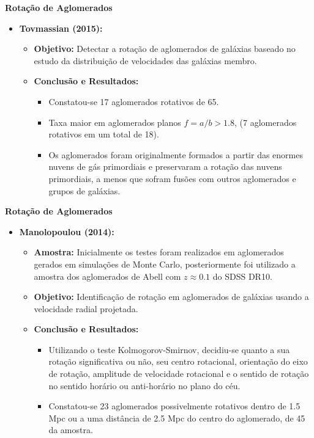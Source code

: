 \documentclass[xcolor=dvipsnames,10pt]{beamer}
\begin{document}
\begin{frame}{\textbf{Rotação de Aglomerados}}
\begin{itemize}
  \item {\textbf{Tovmassian (2015):}}  
    \begin{itemize}
      \item \textbf{Objetivo:} Detectar a rotação de aglomerados de galáxias baseado no estudo da distribuição de velocidades das galáxias membro.
      \item \textbf{Conclusão e Resultados:}
      \begin{itemize}
        \item Constatou-se 17 aglomerados rotativos de 65.
        \item Taxa maior em aglomerados planos $f=a/b > 1.8$, (7 aglomerados rotativos em um total de 18).
        \item Os aglomerados foram originalmente formados a partir das enormes nuvens de gás primordiais e preservaram a rotação das nuvens primordiais, a menos que sofram fusões com outros aglomerados e grupos de galáxias.
      \end{itemize}
    \end{itemize}
\end{itemize}
\end{frame}

\begin{frame}{\textbf{Rotação de Aglomerados}}
\begin{itemize}
  \item {\textbf{Manolopoulou (2014):}}
    \begin{itemize}
      \item \textbf{Amostra:} Inicialmente os testes foram realizados em aglomerados gerados em simulações de Monte Carlo, posteriormente foi utilizado a amostra dos aglomerados de Abell com $z \approx 0.1$ do SDSS DR10.
      \item \textbf{Objetivo:} Identificação de rotação em aglomerados de galáxias usando a velocidade radial projetada.
      \item \textbf{Conclusão e Resultados:}
      \begin{itemize}
        \item Utilizando o teste Kolmogorov-Smirnov, decidiu-se quanto a sua rotação significativa ou não, seu centro rotacional, orientação do eixo de rotação, amplitude de velocidade rotacional e o sentido de rotação no sentido horário ou anti-horário no plano do céu.
        \item Constatou-se 23 aglomerados possivelmente rotativos dentro de 1.5 Mpc ou a uma distância de 2.5 Mpc do centro do aglomerado, de 45 da amostra.
      \end{itemize}
    \end{itemize}
\end{itemize}
\end{frame}
\end{document}
